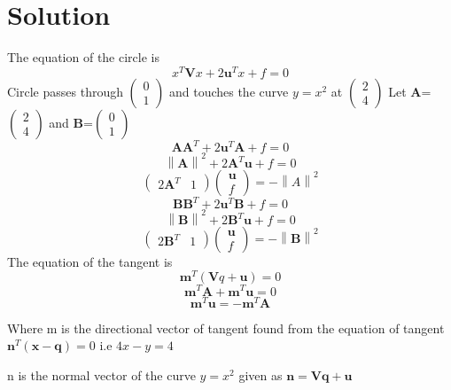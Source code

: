 \documentclass[journal,12pt,twocolumn]
{IEEEtran}
\providecommand{\norm}[1]{\left\lVert#1\right\rVert}
\let\vec\mathbf
\newcommand{\myvec}[1]{\ensuremath{\begin{pmatrix}#1\end{pmatrix}}}
\begin{document}
\section{Solution}
The equation of the circle is 
\begin{equation}
	x^T\vec{V}x + 2\vec{u}^Tx + f = 0
\end{equation}
Circle passes through $\myvec{0\\1}$ and  touches the curve $y=x^2$ at $\myvec{2\\4}$ 
Let $\vec{A}$=$\myvec{2\\4}$ and $\vec{B}$=$\myvec{0\\1} $
\begin{equation}
	\vec{A}\vec{A}^T + 2\vec{u}^T\vec{A} + f = 0
\end{equation}
\begin{equation}
	\norm{\vec{A}}^2 + 2\vec{A}^T \vec{u} + f = 0
\end{equation}
\begin{equation}
	\myvec{2\vec{A}^T & 1}\myvec{\vec{u} \\ f} = -\norm{A}^2 
\end{equation}
\begin{equation}
	\vec{B}\vec{B}^T + 2\vec{u}^T\vec{B} + f = 0
\end{equation}
\begin{equation}
	\norm{\vec{B}}^2 + 2\vec{B}^T\vec{u} + f = 0
\end{equation}
\begin{equation}
	\myvec{2\vec{B}^T & 1}\myvec{\vec{u} \\ f} = -\norm{\vec{B}}^2
\end{equation}
The equation of the tangent is
\begin{equation}
	\vec{m}^T (\vec{V}q + \vec{u}) = 0
\end{equation}
\begin{equation}
	\vec{m}^T\vec{A} +\vec{m}^T\vec{u} = 0
\end{equation}
\begin{equation}
	 \vec{m}^T\vec{u} = -\vec{m}^T\vec{A}
\end{equation}
\begin{center}
Where m is the directional vector of tangent found from the equation of tangent $\vec{n}^T(\vec{x}-\vec{q})=0$ i.e $4x-y=4$
\end{center}
\begin{center}
n is the normal vector of the curve $y=x^2$ given as $\vec{n}=\vec{V}\vec{q}+\vec{u}$
\end{center}
\end{document}
